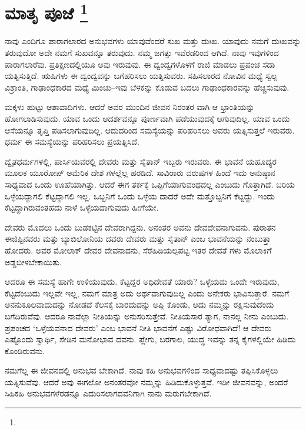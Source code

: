 
\chapter[ಮಾತೃ ಪೂಜೆ ]{ಮಾತೃ ಪೂಜೆ \protect\footnote{}}

ನಾವು ಎಂದಿಗೂ ಪಾರಾಗಲಾರದ ಅನುಭವಗಳು ಯಾವುವೆಂದರೆ ಸುಖ ಮತ್ತು ದುಃಖ. ಯಾವುದು ನಮಗೆ ದುಃಖವನ್ನು ತರುವುದೋ ಅದೇ ನಮಗೆ ಸುಖವನ್ನೂ ತರುವುದು. ನಮ್ಮ ಜಗತ್ತು ಇವೆರಡರಿಂದ ಆಗಿದೆ. ನಾವು ಇವುಗಳಿಂದ ಪಾರಾಗಲಾರೆವು. ಪ್ರತಿಕ್ಷಣದಲ್ಲಿಯೂ ಅವು ಇರುವುವು. ಈ ದ್ವಂದ್ವಗಳೊಳಗೆ ರಾಜಿ ಮಾಡಲು ಪ್ರಪಂಚ ಸದಾ ಯತ್ನಿಸುತ್ತಿದೆ. ಋಷಿಗಳು ಈ ದ್ವಂದ್ವವನ್ನು ಬಗೆಹರಿಸಲು ಯತ್ನಿಸುವರು. ಸಹಿಸಲಾರದ ನೋವಿನ ಮಧ್ಯೆ ಸ್ವಲ್ಪ ವಿಶ್ರಾಂತಿ, ಗಾಢಾಂಧಕಾರದ ಮಧ್ಯೆ ಮಿಂಚು–ಇವು ಬೆಳಕನ್ನು ಕೊಡುವ ಬದಲು ಗಾಢಾಂಧಕಾರವನ್ನು ಹೆಚ್ಚಿಸುವುವು.

ಮಕ್ಕಳು ಹುಟ್ಟು ಆಶಾವಾದಿಗಳು. ಆದರೆ ಅವರ ಮುಂದಿನ ಜೀವನ ನಿರಂತರ ವಾಗಿ ಆ ಭ್ರಾಂತಿಯನ್ನು ಹೋಗಲಾಡಿಸುವುದು. ಯಾವ ಒಂದು ಆದರ್ಶವನ್ನೂ ಪೂರ್ಣವಾಗಿ ಪಡೆಯುವುದಕ್ಕೆ ಆಗುವುದಿಲ್ಲ. ಯಾವ ಒಂದು ಆಸೆಯನ್ನೂ ತೃಪ್ತಿ ಪಡಿಸಲಾಗುವುದಿಲ್ಲ. ಆದುದರಿಂದ ಸಮಸ್ಯೆಯನ್ನು ಪರಿಹರಿಸಲು ಅವರು ಯತ್ನಿಸುತ್ತಲೆ ಇರುವರು. ಧರ್ಮ ಈ ಸಮಸ್ಯೆಯನ್ನು ಪರಿಹರಿಸಲು ಪ್ರಯತ್ನಿಸಿದೆ.

ದ್ವೈತಧರ್ಮಗಳಲ್ಲಿ, ಪಾರ್ಸಿಯವರಲ್ಲಿ ದೇವರು ಮತ್ತು ಸೈತಾನ್​ ಇಬ್ಬರು ಇರುವರು. ಈ ಭಾವನೆ ಯಹೂದ್ಯರ ಮೂಲಕ ಯೂರೋಪ್​ ಅಮೆರಿಕ ದೇಶ ಗಳಲ್ಲೆಲ್ಲ ಹರಡಿದೆ. ಸಾವಿರಾರು ವರುಷಗಳ ಹಿಂದೆ ಇದು ಅನುಷ್ಠಾನ ಸಾಧ್ಯವಾದ ಒಂದು ಊಹೆಯಾಗಿತ್ತು. ಆದರೆ ಈಗ ತರ್ಕಕ್ಕೆ ಒಪ್ಪಿಗೆಯಾಗುವಂಥದಲ್ಲ ಎಂಬುದು ಗೊತ್ತಾಗಿದೆ. ಬರಿಯ ಒಳ್ಳೆಯದ್ದಾಗಲಿ ಕೆಟ್ಟದ್ದಾಗಲಿ ಇಲ್ಲ. ಒಬ್ಬನಿಗೆ ಒಂದು ಒಳ್ಳೆಯ ದಾದರೆ ಅದೇ ಮತ್ತೊಬ್ಬನಿಗೆ ಕೆಟ್ಟದ್ದು. ಇಂದು ಕೆಟ್ಟದ್ದಾಗಿರುವಂತಹದು ನಾಳೆ ಒಳ್ಳೆಯದಾಗುವುದು ಹೀಗೆಯೇ.

ದೇವರು ಮೊದಲು ಒಂದು ಬುಡಕಟ್ಟಿನ ದೇವರಾಗಿದ್ದನು. ಅನಂತರ ಅವನು ದೇವದೇವನಾಗುವನು. ಪುರಾತನ ಈಜಿಪ್ಟಿನವರು ಮತ್ತು ಬ್ಯಾಬಿಲೋನಿಯ ದವರು ದೇವರು ಮತ್ತು ಸೈತಾನ್​ ಎಂಬ ಭಾವನೆಯನ್ನು ನಂಬುತ್ತಾ ಹೋದರು. ಅವರ ಮೋಲಾಕ್​ ದೇವರ ದೇವನಾದನು, ಸೆರೆಹಿಡಿಯಲ್ಪಪಟ್ಟ ಇತರ ದೇವತೆ ಗಳು ಮೊಲಾಕಿಗೆ ಅಡ್ಡಬೀಳಬೇಕಾಯಿತು.

ಆದರೂ ಈ ಸಮಸ್ಯೆ ಹಾಗೇ ಉಳಿಯುವುದು. ಕೆಟ್ಟದ್ದರ ಅಧಿದೇವತೆ ಯಾರು? ಒಳ್ಳೆಯದು ಒಂದೇ ಇರುವುದು, ಕೆಟ್ಟದೆಂಬುದು ಇಲ್ಲವೇ ಇಲ್ಲ, ನಮಗೆ ಮಾತ್ರ ಅದು ಅರ್ಥವಾಗುವುದಿಲ್ಲ ಎಂದು ಅನೇಕರು ಭಾವಿಸುತ್ತಾರೆ. ನಮಗೆ ಅನನುಕೂಲವಾದುದನ್ನು ನೋಡದೆ ಕೆಲಸಕ್ಕೆ ಬಾರದುದನ್ನು ಅಪ್ಪಿ ಕೊಂಡು, ಅದು ನಮ್ಮನ್ನು ರಕ್ಷಿಸುವುದೆಂದು ಬಗೆದಿರುವೆವು. ಆದರೂ ನಾವೆಲ್ಲಾ ನೀತಿಯನ್ನು ಅನುಸರಿಸುತ್ತೇವೆ. ನೀತಿಯಸಾರ ತ್ಯಾಗ, ನಾನಲ್ಲ ನೀನು ಎಂಬುದು. ಪ್ರಪಂಚದ ‘ಒಳ್ಳೆಯವನಾದ ದೇವರು’ ಎಂಬ ಭಾವನೆ ನೀತಿ ಭಾವನೆಗೆ ಎಷ್ಟು ವಿರೋಧವಾಗಿದೆ! ಆ ದೇವರು ಎಷ್ಟೊಂದು ಸ್ವಾರ್ಥಿ, ಸೇಡಿನ ಮನೋಭಾವ ದವನು. ಪ್ಲೇಗು, ಬರಗಾಲ, ಯುದ್ಧ ಇವನ್ನು ತನ್ನ ಕೈಗಳಲ್ಲಿಯೇ ಹಿಡಿದು ಕೊಂಡಿರುವನು.

ನಮಗೆಲ್ಲ ಈ ಜೀವನದಲ್ಲಿ ಅನುಭವ ಬೇಕಾಗಿದೆ. ನಾವು ಕಹಿ ಅನುಭವಗಳಿಂದ ಸಾಧ್ಯವಾದಷ್ಟು ತಪ್ಪಿಸಿಕೊಳ್ಳಲು ಯತ್ನಿಸುವೆವು. ಆದರೆ ಅವು ಈಗಲೋ ಅನಂತರವೋ ನಮ್ಮನ್ನು ಹಿಡಿದುಕೊಳ್ಳುತ್ತವೆ. ಇಡೀ ಜೀವನವನ್ನು, ಅಂದರೆ ಸಿಹಿಕಹಿ ಅನುಭವಗಳೆರಡನ್ನೂ ಎದುರಿಸಲಾಗದವನಿಗಾಗಿ ನಾನು ಮರುಗಬೇಕಾಗಿದೆ.


